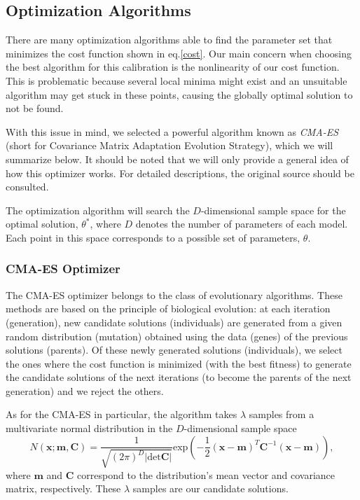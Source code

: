 \subsection{Optimization Algorithms}
There are many optimization algorithms able to find the parameter set that minimizes the cost function shown in eq.\eqref{cost}.
Our main concern when choosing the best algorithm for this calibration is the nonlinearity of our cost function. This is problematic because several local minima might exist and an unsuitable algorithm may get stuck in these points, causing the globally optimal solution to not be found.

With this issue in mind, we selected a powerful algorithm known as \emph{CMA-ES}~\citep{Hansen2} (short for Covariance Matrix Adaptation Evolution Strategy), which we will summarize below. It should be noted that we will only provide a general idea of how this optimizer works. For detailed descriptions, the original source should be consulted.

The optimization algorithm will search the $D$-dimensional sample space for the optimal solution, $\theta^{*}$, where $D$ denotes the number of parameters of each model. Each point in this space corresponds to a possible set of parameters, $\theta$.




\subsubsection{CMA-ES Optimizer}
The CMA-ES optimizer belongs to the class of evolutionary algorithms. These methods are based on the principle of biological evolution: at each iteration (generation), new candidate solutions (individuals) are generated from a given random distribution (mutation) obtained using the data (genes) of the previous solutions (parents). Of these newly generated solutions (individuals), we select the ones where the cost function is minimized (with the best fitness) to generate the candidate solutions of the next iterations (to become the parents of the next generation) and we reject the others.



As for the CMA-ES in particular, the algorithm takes $\lambda$ samples from a multivariate normal distribution in the $D$-dimensional sample space
\begin{equation}
N(\mathbf{x;m,C})=\frac{1}{\sqrt{(2\pi)^D|\mathrm{det}\mathbf{C}|}}\mathrm{exp}\left(-\frac{1}{2}(\mathbf{x}-\mathbf{m})^T\mathbf{C}^{-1}(\mathbf{x}-\mathbf{m})\right),
\end{equation}
\noindent where $\mathbf{m}$ and $\mathbf{C}$ correspond to the distribution's mean vector and covariance matrix, respectively.
These $\lambda$ samples are our candidate solutions.

